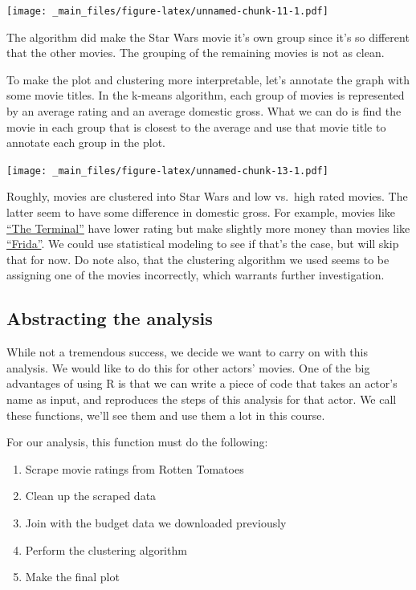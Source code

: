 \documentclass[]{article}
\theoremstyle{definition}
\theoremstyle{definition}
\theoremstyle{remark}
\begin{document}
\texttt{[image: \_main\_files/figure-latex/unnamed-chunk-11-1.pdf]}

The algorithm did make the Star Wars movie it's own group since it's so
different that the other movies. The grouping of the remaining movies is
not as clean.

To make the plot and clustering more interpretable, let's annotate the
graph with some movie titles. In the k-means algorithm, each group of
movies is represented by an average rating and an average domestic
gross. What we can do is find the movie in each group that is closest to
the average and use that movie title to annotate each group in the plot.

\texttt{[image: \_main\_files/figure-latex/unnamed-chunk-13-1.pdf]}

Roughly, movies are clustered into Star Wars and low vs.~high rated
movies. The latter seem to have some difference in domestic gross. For
example, movies like
\href{https://www.rottentomatoes.com/m/1133499_1133499_terminal}{``The
Terminal''} have lower rating but make slightly more money than movies
like \href{https://www.rottentomatoes.com/m/frida}{``Frida''}. We could
use statistical modeling to see if that's the case, but will skip that
for now. Do note also, that the clustering algorithm we used seems to be
assigning one of the movies incorrectly, which warrants further
investigation.

\subsection{Abstracting the analysis}\label{abstracting-the-analysis}

While not a tremendous success, we decide we want to carry on with this
analysis. We would like to do this for other actors' movies. One of the
big advantages of using R is that we can write a piece of code that
takes an actor's name as input, and reproduces the steps of this
analysis for that actor. We call these functions, we'll see them and use
them a lot in this course.

For our analysis, this function must do the following:

\begin{enumerate}
\def\labelenumi{\arabic{enumi}.}
\itemsep1pt\parskip0pt
\item
  Scrape movie ratings from Rotten Tomatoes
\item
  Clean up the scraped data
\item
  Join with the budget data we downloaded previously
\item
  Perform the clustering algorithm
\item
  Make the final plot
\end{enumerate}
\end{document}
